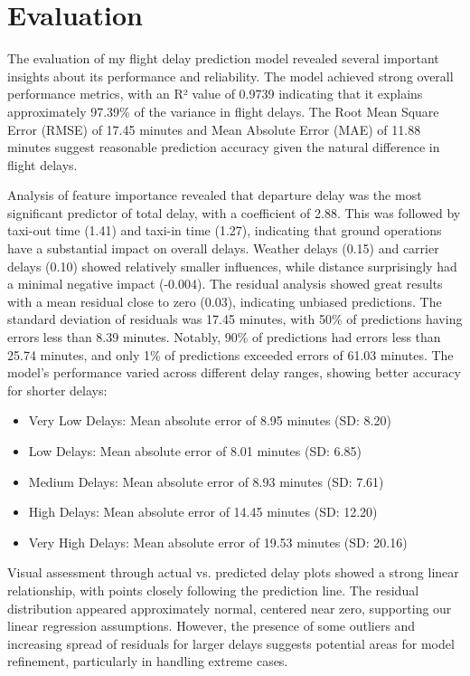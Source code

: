 \section{Evaluation}
The evaluation of my flight delay prediction model revealed several important insights about its performance and reliability. 
The model achieved strong overall performance metrics, with an R² value of 0.9739 indicating that it explains approximately 97.39\% of the variance in flight delays. 
The Root Mean Square Error (RMSE) of 17.45 minutes and Mean Absolute Error (MAE) of 11.88 minutes suggest reasonable prediction accuracy given the natural difference in flight delays.

Analysis of feature importance revealed that departure delay was the most significant predictor of total delay, with a coefficient of 2.88. 
This was followed by taxi-out time (1.41) and taxi-in time (1.27), indicating that ground operations have a substantial impact on overall delays. 
Weather delays (0.15) and carrier delays (0.10) showed relatively smaller influences, while distance surprisingly had a minimal negative impact (-0.004).
The residual analysis showed great results with a mean residual close to zero (0.03), indicating unbiased predictions. 
The standard deviation of residuals was 17.45 minutes, with 50\% of predictions having errors less than 8.39 minutes. 
Notably, 90\% of predictions had errors less than 25.74 minutes, and only 1\% of predictions exceeded errors of 61.03 minutes.
The model's performance varied across different delay ranges, showing better accuracy for shorter delays:

\begin{itemize}
\item Very Low Delays: Mean absolute error of 8.95 minutes (SD: 8.20)
\item Low Delays: Mean absolute error of 8.01 minutes (SD: 6.85)
\item Medium Delays: Mean absolute error of 8.93 minutes (SD: 7.61)
\item High Delays: Mean absolute error of 14.45 minutes (SD: 12.20)
\item Very High Delays: Mean absolute error of 19.53 minutes (SD: 20.16)
\end{itemize}
Visual assessment through actual vs. predicted delay plots showed a strong linear relationship, with points closely following the prediction line. The residual distribution appeared approximately normal, centered near zero, supporting our linear regression assumptions. However, the presence of some outliers and increasing spread of residuals for larger delays suggests potential areas for model refinement, particularly in handling extreme cases.

